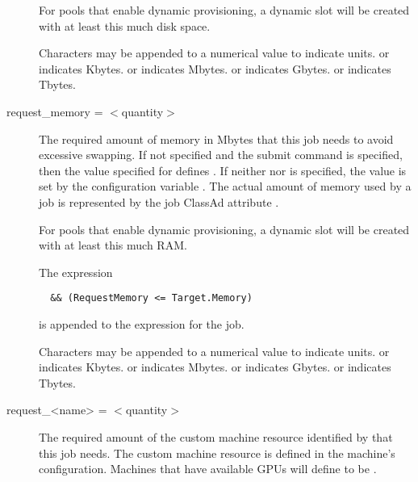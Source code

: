\begin{description}
For pools that enable
dynamic  provisioning,
a dynamic slot will be created with at least this much disk space.

Characters may be appended to a numerical value to indicate units. 
 or  indicates Kbytes.
 or  indicates Mbytes.
 or  indicates Gbytes.
 or  indicates Tbytes.


\label{man-condor-submit-request-memory}
\item[request\_memory = $<$quantity$>$] 
The required amount of memory in Mbytes that this job needs
to avoid excessive swapping.
If not specified and the submit command  is specified, 
then the value specified
for  defines .
If neither  nor  is specified,
the value is set by the configuration variable
.
The actual amount of memory used by a job is represented by the
job ClassAd attribute .

For pools that enable
dynamic  provisioning,
a dynamic slot will be created with at least this much RAM.

The expression
\begin{verbatim}
  && (RequestMemory <= Target.Memory) 
\end{verbatim}
is appended to the  expression for the job.

Characters may be appended to a numerical value to indicate units. 
 or  indicates Kbytes.
 or  indicates Mbytes.
 or  indicates Gbytes.
 or  indicates Tbytes.


\label{man-condor-submit-request-name}
\item[request\_<name> = $<$quantity$>$] 
The required amount of the custom machine resource 
identified by  that this job needs.
The custom machine resource is defined in the machine's configuration.
Machines that have available GPUs will define 
to be .



\end{description}
